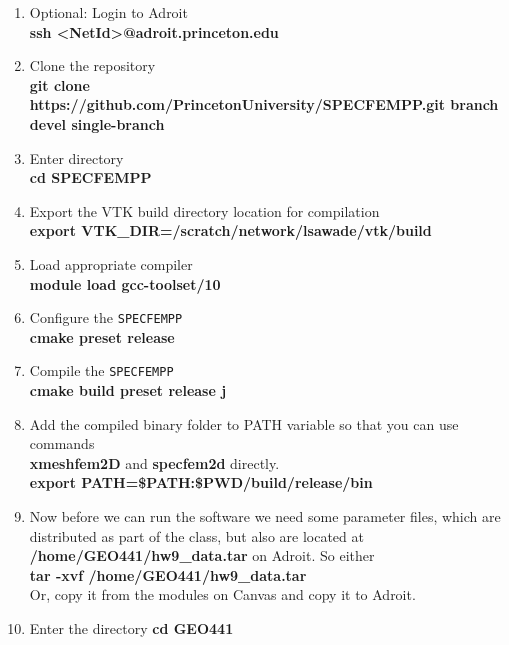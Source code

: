 \documentclass[11pt,titlepage,fleqn]{article}
\begin{document}
\begin{enumerate}

\item Optional: Login to Adroit\\
{\bf ssh <NetId>@adroit.princeton.edu}       
    
\item Clone the repository\\
      {\bf git clone https://github.com/PrincetonUniversity/SPECFEMPP.git \newline \text{-}\text{-}branch devel \text{-}\text{-}single-branch}
\item Enter directory\\
      {\bf cd SPECFEMPP}       
		
\item Export the VTK build directory location for compilation\\
      {\bf export VTK\_DIR=/scratch/network/lsawade/vtk/build}

\item Load appropriate compiler\\
      {\bf module load gcc-toolset/10}

\item Configure the \texttt{SPECFEMPP}\\
      {\bf cmake \text{-}\text{-}preset release}

\item Compile the \texttt{SPECFEMPP}\\
      {\bf cmake \text{-}\text{-}build \text{-}\text{-}preset release \text{-}j}

\item Add the compiled binary folder to PATH variable so that you can use commands \\{\bf xmeshfem2D} and {\bf specfem2d} directly.\\
      {\bf export PATH=\$PATH:\$PWD/build/release/bin}

\item Now before we can run the software we need some parameter files, which are distributed as part of the class, but also are located at {\bf /home/GEO441/hw9\_data.tar} on Adroit. So either \\
      {\bf tar -xvf /home/GEO441/hw9\_data.tar}\\
    Or, copy it from the modules on Canvas and copy it to Adroit.
      
\item Enter the directory
      {\bf cd GEO441}


\end{enumerate}
\end{document}
